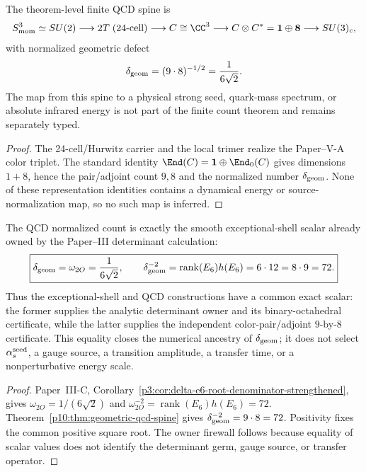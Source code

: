 \documentclass[12pt,a4paper]{article}
\providecommand{\deltageom}{\delta_{\rm geom}}
\providecommand{\alphasseed}{\alpha_s^{\rm seed}}
\begin{document}
\begin{theorem}
\label{p10:thm:geometric-qcd-spine}
The theorem-level finite QCD spine is
\begin{equation}
\label{p10:eq:geometric-qcd-spine}
S^3_{\rm mom}\simeq SU(2)
\longrightarrow 2T\;(24\text{-cell})
\longrightarrow C\cong\CC^3
\longrightarrow C\otimes C^\ast=\mathbf1\oplus\mathbf8
\longrightarrow SU(3)_c,
\end{equation}
with normalized geometric defect
\begin{equation}
\label{p10:eq:delta-from-color-pair-and-octet}
\deltageom=(9\cdot8)^{-1/2}=\frac1{6\sqrt2}.
\end{equation}
The map from this spine to a physical strong seed, quark-mass spectrum, or absolute infrared energy is not part of the finite count theorem and remains separately typed.
\end{theorem}
\begin{proof}
The 24-cell/Hurwitz carrier and the local trimer realize the Paper--V-A color triplet.  The standard identity \(\End(C)=\mathbf1\oplus\End_0(C)\) gives dimensions \(1+8\), hence the pair/adjoint count \(9,8\) and the normalized number \(\deltageom\).  None of these representation identities contains a dynamical energy or source-normalization map, so no such map is inferred.
\end{proof}

\begin{corollary}
\label{p10:cor:exceptional-shell-ancestry-of-qcd-delta}
The QCD normalized count is exactly the smooth exceptional-shell scalar
already owned by the Paper--III determinant calculation:
\begin{equation}
\label{p10:eq:qcd-delta-exceptional-shell-ancestry}
 \boxed{
 \deltageom=\omega_{2O}=\frac1{6\sqrt2},
 \qquad
 \deltageom^{-2}
 =\operatorname{rank}(E_6)h(E_6)
 =6\cdot12
 =8\cdot9
 =72.}
\end{equation}
Thus the exceptional-shell and QCD constructions have a common exact scalar:
the former supplies the analytic determinant owner and its binary-octahedral
certificate, while the latter supplies the independent color-pair/adjoint
\(9\)-by-\(8\) certificate.  This equality closes the numerical ancestry of
\(\deltageom\); it does not select \(\alphasseed\), a gauge source, a
transition amplitude, a transfer time, or a nonperturbative energy scale.
\end{corollary}

\begin{proof}
Paper~III-C, Corollary~\ref{p3:cor:delta-e6-root-denominator-strengthened},
gives \(\omega_{2O}=1/(6\sqrt2)\) and
\(\omega_{2O}^{-2}=\operatorname{rank}(E_6)h(E_6)=72\).  Theorem~\ref{p10:thm:geometric-qcd-spine}
gives \(\deltageom^{-2}=9\cdot8=72\).  Positivity fixes the common positive
square root.  The owner firewall follows because equality of scalar values
does not identify the determinant germ, gauge source, or transfer operator.
\end{proof}
\end{document}
